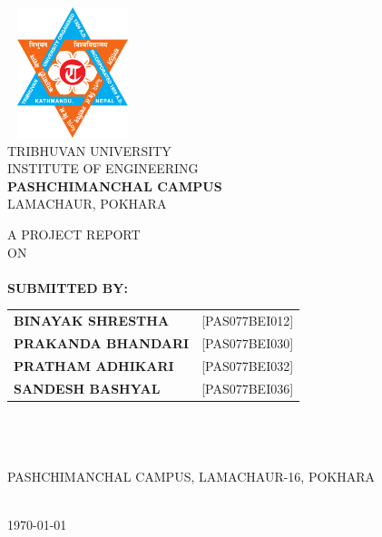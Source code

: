 \begin{titlingpage} 
    \begin{normalsize}
    \begin{center}
    \includegraphics[width=1.5in, height=1.5in]{./Graphics/logo.png}\\
    
     TRIBHUVAN UNIVERSITY\\
     INSTITUTE OF ENGINEERING\\
    
    \textbf{\MakeUppercase PASHCHIMANCHAL CAMPUS}\\
    \MakeUppercase{Lamachaur, Pokhara}
    \end{center}
    \vspace{1cm}
    
    \begin{center}
    A PROJECT REPORT\\
    ON\\
    \textbf{\MakeUppercase \thetitle} \\
    \vspace{1.5 cm}
    \textbf{SUBMITTED BY:}\\
\begin{tabular}{p{5cm} l}
    \textbf{BINAYAK SHRESTHA} & [PAS077BEI012]\\
    \textbf{PRAKANDA BHANDARI} & [PAS077BEI030]\\
    \textbf{PRATHAM ADHIKARI} & [PAS077BEI032]\\
    \textbf{SANDESH BASHYAL} & [PAS077BEI036]\\
\end{tabular}\\
    \vspace{2 cm}
    \\
    \\
    \MakeUppercase {Pashchimanchal Campus, Lamachaur-16, Pokhara}\par\\
    \vspace{1.5cm}
    {\monthyeardate\today}
    \end{center}
    \end{normalsize}
    \end{titlingpage}
    \newpage